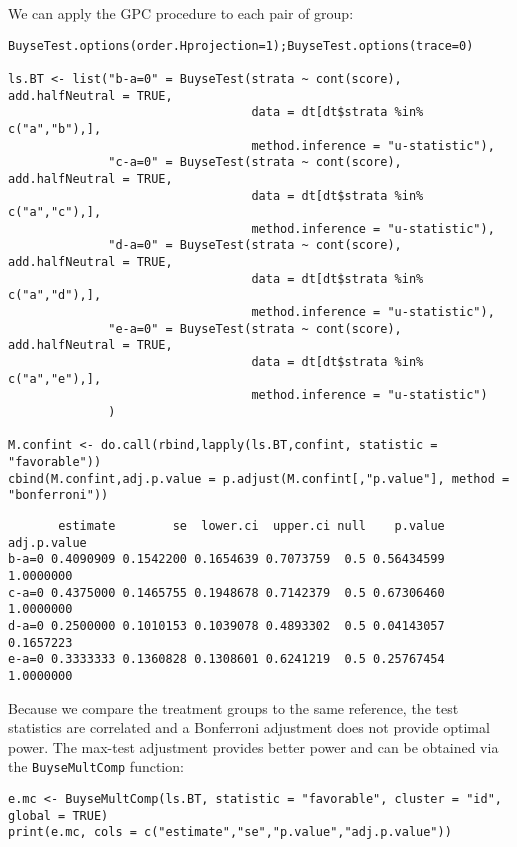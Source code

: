 \documentclass[12pt]{article}
\begin{document}
We can apply the GPC procedure to each pair of group:
\lstset{language=r,label= ,caption= ,captionpos=b,numbers=none}
\begin{lstlisting}
BuyseTest.options(order.Hprojection=1);BuyseTest.options(trace=0)

ls.BT <- list("b-a=0" = BuyseTest(strata ~ cont(score), add.halfNeutral = TRUE,
                                  data = dt[dt$strata %in% c("a","b"),],
                                  method.inference = "u-statistic"),
              "c-a=0" = BuyseTest(strata ~ cont(score), add.halfNeutral = TRUE,
                                  data = dt[dt$strata %in% c("a","c"),],
                                  method.inference = "u-statistic"),
              "d-a=0" = BuyseTest(strata ~ cont(score), add.halfNeutral = TRUE,
                                  data = dt[dt$strata %in% c("a","d"),],
                                  method.inference = "u-statistic"),
              "e-a=0" = BuyseTest(strata ~ cont(score), add.halfNeutral = TRUE,
                                  data = dt[dt$strata %in% c("a","e"),],
                                  method.inference = "u-statistic")
              )

M.confint <- do.call(rbind,lapply(ls.BT,confint, statistic = "favorable"))
cbind(M.confint,adj.p.value = p.adjust(M.confint[,"p.value"], method = "bonferroni"))
\end{lstlisting}

\begin{verbatim}
       estimate        se  lower.ci  upper.ci null    p.value adj.p.value
b-a=0 0.4090909 0.1542200 0.1654639 0.7073759  0.5 0.56434599   1.0000000
c-a=0 0.4375000 0.1465755 0.1948678 0.7142379  0.5 0.67306460   1.0000000
d-a=0 0.2500000 0.1010153 0.1039078 0.4893302  0.5 0.04143057   0.1657223
e-a=0 0.3333333 0.1360828 0.1308601 0.6241219  0.5 0.25767454   1.0000000
\end{verbatim}



Because we compare the treatment groups to the same reference, the
test statistics are correlated and a Bonferroni adjustment does not
provide optimal power. The max-test adjustment provides better power
and can be obtained via the \texttt{BuyseMultComp} function:
\lstset{language=r,label= ,caption= ,captionpos=b,numbers=none}
\begin{lstlisting}
e.mc <- BuyseMultComp(ls.BT, statistic = "favorable", cluster = "id", global = TRUE)
print(e.mc, cols = c("estimate","se","p.value","adj.p.value"))
\end{lstlisting}
\end{document}
